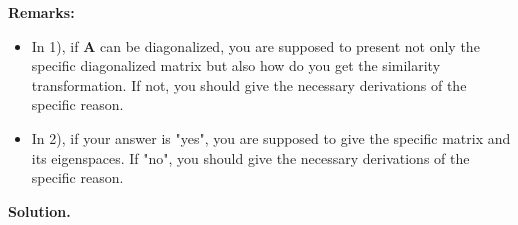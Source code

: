 \documentclass[english,onecolumn]{IEEEtran}
\begin{document}
{\bf Remarks:} 
\begin{itemize}
    \item In 1), if {\bf A} can be diagonalized, you are supposed to present not only the specific diagonalized matrix but also how do you get the similarity transformation.
    If not, you should give the necessary derivations of the specific reason.
    \item In 2), if your answer is "yes", you are supposed to give the specific matrix and its eigenspaces.
    If "no", you should give the necessary derivations of the specific reason.
\end{itemize}

\noindent
\textbf{Solution.}
\end{document}

